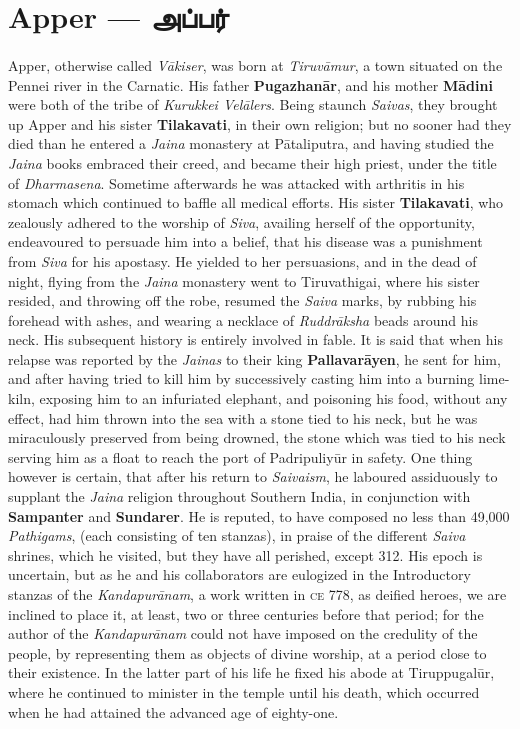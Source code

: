 \documentclass{article}
\newcommand{\TamilBold}[1]{\texttamil{\textbf{#1}}}
\newcommand{\tambold}[1]{\TamilBold{#1}}
\begin{document}
\section{Apper --- \tambold{அப்பர்}}
\paragraph{}
Apper, otherwise called \emph{V\={a}kiser}, was born at \emph{Tiruv\={a}mur}, a town situated on the Pennei river in the Carnatic. His father \textbf{Pugazhan\={a}r}, and his mother \textbf{M\={a}dini} were both of the tribe of \emph{Kurukkei Vel\={a}lers}. Being staunch \emph{Saivas}, they brought up Apper and his sister \textbf{Tilakavati}, in their own religion; but no sooner had they died than he entered a \emph{Jaina} monastery at P\={a}taliputra, and having studied the \emph{Jaina} books embraced their creed, and became their high priest, under the title of \emph{Dharmasena}. Sometime afterwards he was attacked with arthritis in his stomach which continued to baffle all medical efforts. His sister \textbf{Tilakavati}, who zealously adhered to the worship of \emph{Siva}, availing herself of the opportunity, endeavoured to persuade him into a belief, that his disease was a punishment from \emph{Siva} for his apostasy. He yielded to her persuasions, and in the dead of night, flying from the \emph{Jaina} monastery went to Tiruvathigai, where his sister resided, and throwing off the robe, resumed the \emph{Saiva} marks, by rubbing his forehead with ashes, and wearing a necklace of \emph{Ruddr\={a}ksha} beads around his neck. His subsequent history is entirely involved in fable. It is said that when his relapse was reported by the \emph{Jainas} to their king \textbf{Pallavar\={a}yen}, he sent for him, and after having tried to kill him by successively casting him into a burning lime-kiln, exposing him to an infuriated elephant, and poisoning his food, without any effect, had him thrown into the sea with a stone tied to his neck, but he was miraculously preserved from being drowned, the stone which was tied to his neck serving him as a float to reach the port of Padripuliy\={u}r in safety. One thing however is certain, that after his return to \emph{Saivaism}, he laboured assiduously to supplant the \emph{Jaina} religion throughout Southern India, in conjunction with \textbf{Sampanter} and \textbf{Sundarer}. He is reputed, to have composed no less than 49,000 \emph{Pathigams}, (each consisting of ten stanzas), in praise of the different \emph{Saiva} shrines, which he visited, but they have all perished, except 312. His epoch is uncertain, but as he and his collaborators are eulogized in the Introductory stanzas of the \emph{Kandapur\={a}nam}, a work written in \textsc{ce} 778, as deified heroes, we are inclined to place it, at least, two or three centuries before that period; for the author of the \emph{Kandapur\={a}nam} could not have imposed on the credulity of the people, by representing them as objects of divine worship, at a period close to their existence. In the latter part of his life he fixed his abode at Tiruppugal\={u}r, where he continued to minister in the temple until his death, which occurred when he had attained the advanced age of eighty-one.
\end{document}
